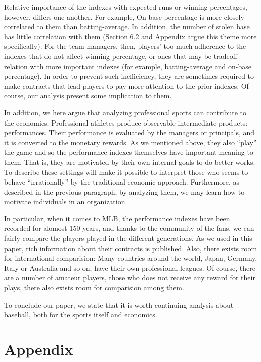 \documentclass[dvipdfmx, 12pt]{article}
\begin{document}
Relative importance of the indexes with expected runs or winning-percentages, however, differs one another. For example, On-base percentage is more closely correlated to them than batting-average. In addition, the number of stolen base has little correlation with them (Section 6.2 and Appendix argue this theme more specifically). For the team managers, then, players' too much adherence to the indexes that do not affect winning-percentage, or ones that may be tradeoff-relation with more important indexes (for example, batting-average and on-base percentage). In order to prevent such inefficiency, they are sometimes required to make contracts that lead players to pay more attention to the prior indexes. Of course, our analysis present some implication to them.

In addition, we here argue that analyzing professional sports can contribute to the economics. Professional athletes produce observable intermediate products: performances. Their performance is evaluated by the managers or principals, and it is converted to the monetary rewards. As we mentioned above, they also ``play'' the game and so the performance indexes themselves have important meaning to them. That is, they are motivated by their own internal goals to do better works. To describe these settings will make it possible to interpret those who seems to behave ``irrationally'' by the traditional economic approach. Furthermore, as described in the previous paragraph, by analyzing them, we may learn how to motivate individuals in an organization.

In particular, when it comes to MLB, the performance indexes have been recorded for alomost 150 years, and thanks to the community of the fans, we can fairly compare the players played in the different generations. As we used in this paper, rich information about their contracts is published. Also, there exists room for international comparision: Many countries around the world, Japan, Germany, Italy or Australia and so on, have their own professional leagues. Of course, there are a number of amateur players, those who does not receive any reward for their plays, there also exists room for comparision among them.

To conclude our paper, we state that it is worth continuing analysis about baseball, both for the sports itself and economics.

\section{Appendix}
\end{document}
